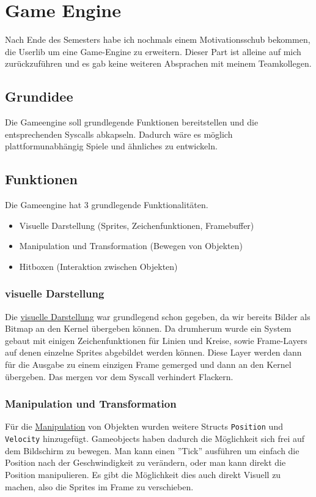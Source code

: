 \section{Game Engine}
    Nach Ende des Semesters habe ich nochmals einem Motivationsschub bekommen, die Userlib um eine Game-Engine zu erweitern. Dieser Part ist alleine auf mich zurückzuführen und es gab keine weiteren Absprachen mit meinem Teamkollegen.

\subsection{Grundidee}
    Die Gameengine soll grundlegende Funktionen bereitstellen und die entsprechenden Syscalls abkapseln. Dadurch wäre es möglich plattformunabhängig Spiele und ähnliches zu entwickeln. 

\subsection{Funktionen}
    Die Gameengine hat 3 grundlegende Funktionalitäten. 
    \begin{itemize}
        \item Visuelle Darstellung (Sprites, Zeichenfunktionen, Framebuffer)
        \item Manipulation und Transformation (Bewegen von Objekten)
        \item Hitboxen (Interaktion zwischen Objekten)
    \end{itemize}
    
    \subsubsection{visuelle Darstellung}
        Die \underline{visuelle Darstellung} war grundlegend schon gegeben, da wir bereits Bilder als Bitmap an den Kernel übergeben können. Da drumherum wurde ein System gebaut mit einigen Zeichenfunktionen für Linien und Kreise, sowie Frame-Layers auf denen einzelne Sprites abgebildet werden können. Diese Layer werden dann für die Ausgabe zu einem einzigen Frame gemerged und dann an den Kernel übergeben. Das mergen vor dem Syscall verhindert Flackern.

    \subsubsection{Manipulation und Transformation}
        Für die \underline{Manipulation} von Objekten wurden weitere Structs \verb|Position| und \verb|Velocity| hinzugefügt. Gameobjects haben dadurch die Möglichkeit sich frei auf dem Bildschirm zu bewegen. Man kann einen ''Tick'' ausführen um einfach die Position nach der Geschwindigkeit zu verändern, oder man kann direkt die Position manipulieren.
        Es gibt die Möglichkeit dies auch direkt Visuell zu machen, also die Sprites im Frame zu verschieben.

